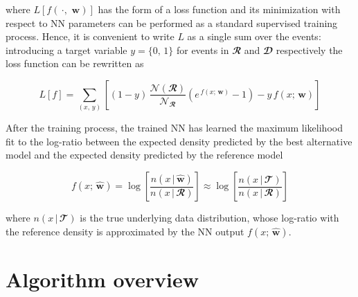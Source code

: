 \noindent where $L\left[f(\,\cdot,\,\,\mathbf{w})\right]$ has the form of a loss function and its minimization with
respect to NN parameters can be performed as a standard supervised training process. Hence, it is convenient to write
$L$ as a single sum over the events: introducing a target variable $y=\{0,\,1\}$ for events in $\mathbfcal{R}$ and
$\mathbfcal{D}$ respectively the loss function can be rewritten as

\begin{equation}\label{eq:loss}
    L[f]=\sum_{(x,\,y)}
    \left[
        (1-y)\,
        \frac{
            \mathcal{N}(\mathbfcal{R})
        }{
            \mathcal{N}_{\mathbfcal{R}}
        }
        \left(
            e^{\,f(x;\,\mathbf{w})} - 1
        \right)
        -y\,f(x;\,\mathbf{w})
    \right]
\end{equation}

\noindent After the training process, the trained NN has learned the maximum likelihood fit to the log-ratio between
the expected density predicted by the best alternative model and the expected density predicted by the reference model

\begin{equation}
    f(x;\,\widehat{\mathbf{w}}) = 
    \log
    \left[
        \frac{
            n(x\,|\,\widehat{\mathbf{w}})
        }{
            n(x\,|\,\mathbfcal{R})
        }
    \right]
    \approx
    \log
    \left[
        \frac{
            n(x\,|\,\mathbfcal{T})
        }{
            n(x\,|\,\mathbfcal{R})
        }
    \right]
\end{equation}

\noindent where $n(x\,|\,\mathbfcal{T})$ is the true underlying data distribution, whose log-ratio with the reference
density is approximated by the NN output $f(x;\,\widehat{\mathbf{w}})$.


\section{Algorithm overview}
\label{sec:overview}

